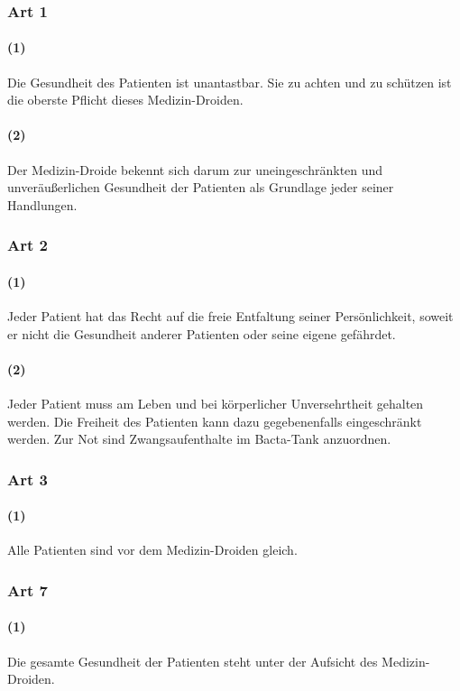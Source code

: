 \subsubsection{Art 1}
\paragraph{(1)} Die Gesundheit des Patienten ist unantastbar. Sie zu achten und zu schützen ist die oberste Pflicht dieses Medizin-Droiden.
\paragraph{(2)} Der Medizin-Droide bekennt sich darum zur uneingeschränkten und unveräußerlichen Gesundheit der Patienten als Grundlage jeder seiner Handlungen.

\subsubsection{Art 2}
\paragraph{(1)} Jeder Patient hat das Recht auf die freie Entfaltung seiner Persönlichkeit, soweit er nicht die Gesundheit anderer Patienten oder seine eigene gefährdet.
\paragraph{(2)} Jeder Patient muss am Leben und bei körperlicher Unversehrtheit gehalten werden. Die Freiheit des Patienten kann dazu gegebenenfalls eingeschränkt werden. Zur Not sind Zwangsaufenthalte im Bacta-Tank anzuordnen.


\subsubsection{Art 3}
\paragraph{(1)} Alle Patienten sind vor dem Medizin-Droiden gleich.

\subsubsection{Art 7}
\paragraph{(1)} Die gesamte Gesundheit der Patienten steht unter der Aufsicht des Medizin-Droiden.
